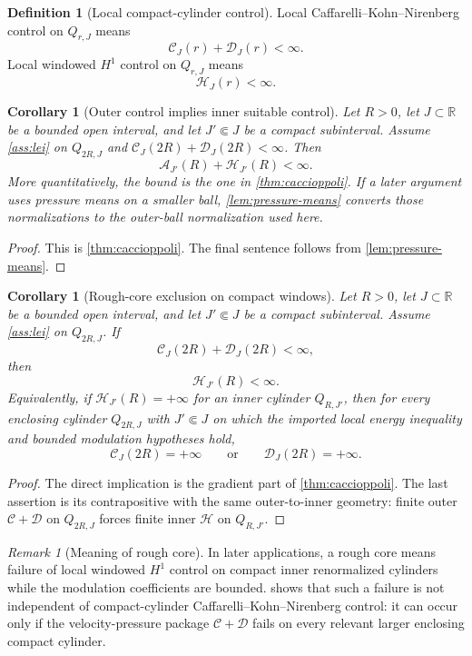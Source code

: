 \documentclass[11pt]{amsart}
\theoremstyle{plain}
\newtheorem{corollary}[theorem]{Corollary}
\theoremstyle{definition}
\newtheorem{definition}[theorem]{Definition}
\theoremstyle{remark}
\newtheorem{remark}[theorem]{Remark}
\begin{document}
\begin{definition}[Local compact-cylinder control]
Local Caffarelli--Kohn--Nirenberg control on $Q_{r,J}$ means
\[
\mathcal C_J(r)+\mathcal D_J(r)<\infty.
\]
Local windowed $H^1$ control on $Q_{r,J}$ means
\[
\mathcal H_J(r)<\infty.
\]
\end{definition}

\begin{corollary}[Outer control implies inner suitable control]\label{cor:outer-inner}
Let $R>0$, let $J\subset\mathbb R$ be a bounded open interval, and let
$J'\Subset J$ be a compact subinterval. Assume \cref{ass:lei} on $Q_{2R,J}$ and
$\mathcal C_J(2R)+\mathcal D_J(2R)<\infty$. Then
\[
\mathcal A_{J'}(R)+\mathcal H_{J'}(R)<\infty.
\]
More quantitatively, the bound is the one in \cref{thm:caccioppoli}. If a
later argument uses pressure means on a smaller ball, \cref{lem:pressure-means}
converts those normalizations to the outer-ball normalization used here.
\end{corollary}

\begin{proof}
This is \cref{thm:caccioppoli}. The final sentence follows from
\cref{lem:pressure-means}.
\end{proof}

\begin{corollary}[Rough-core exclusion on compact windows]\label{cor:rough-core}
Let $R>0$, let $J\subset\mathbb R$ be a bounded open interval, and let
$J'\Subset J$ be a compact subinterval. Assume \cref{ass:lei} on $Q_{2R,J}$. If
\[
\mathcal C_J(2R)+\mathcal D_J(2R)<\infty,
\]
then
\[
\mathcal H_{J'}(R)<\infty.
\]
Equivalently, if $\mathcal H_{J'}(R)=+\infty$ for an inner cylinder
$Q_{R,J'}$, then for every enclosing cylinder $Q_{2R,J}$ with
$J'\Subset J$ on which the imported local energy inequality and bounded
modulation hypotheses hold,
\[
\mathcal C_J(2R)=+\infty
\qquad\text{or}\qquad
\mathcal D_J(2R)=+\infty.
\]
\end{corollary}

\begin{proof}
The direct implication is the gradient part of \cref{thm:caccioppoli}. The
last assertion is its contrapositive with the same outer-to-inner geometry:
finite outer $\mathcal C+\mathcal D$ on $Q_{2R,J}$ forces finite inner
$\mathcal H$ on $Q_{R,J'}$.
\end{proof}

\begin{remark}[Meaning of rough core]
In later applications, a rough core means failure of local windowed $H^1$
control on compact inner renormalized cylinders while the modulation
coefficients are bounded.  shows that such a failure is
not independent of compact-cylinder Caffarelli--Kohn--Nirenberg control: it can
occur only if the velocity-pressure package $\mathcal C+\mathcal D$ fails on
every relevant larger enclosing compact cylinder.
\end{remark}
\end{document}
